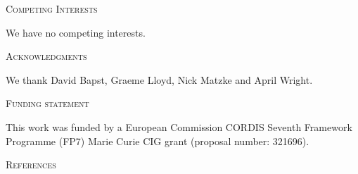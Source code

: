 \documentclass[12pt,letterpaper]{article}
\renewcommand{\section}[1]{%
\bigskip
\begin{center}
\begin{Large}
\normalfont\scshape #1
\medskip
\end{Large}
\end{center}}
\begin{document}
\section{Competing Interests}
We have no competing interests.
\section{Acknowledgments}
We thank David Bapst, Graeme Lloyd, Nick Matzke and April Wright.
\section{Funding statement}
This work was funded by a European Commission CORDIS Seventh Framework Programme (FP7) Marie Curie CIG grant (proposal number: 321696).

\section{References}




\end{document}
